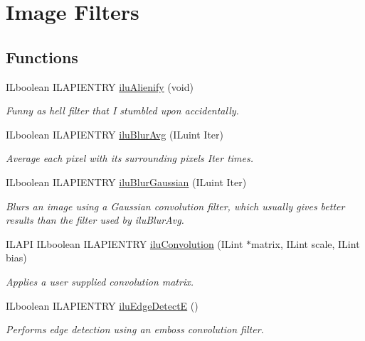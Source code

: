 \hypertarget{group__filter}{\section{Image Filters}
\label{group__filter}
}
\subsection*{Functions}
\begin{DoxyCompactItemize}
\item 
I\-Lboolean I\-L\-A\-P\-I\-E\-N\-T\-R\-Y \hyperlink{group__filter_gacb6e1a0e8dc10748f1cfbf60b1f8c350}{ilu\-Alienify} (void)
\begin{DoxyCompactList}\small\item\em Funny as hell filter that I stumbled upon accidentally. \end{DoxyCompactList}\item 
I\-Lboolean I\-L\-A\-P\-I\-E\-N\-T\-R\-Y \hyperlink{group__filter_ga017478330f243e5bb6e6edc29cdf1f37}{ilu\-Blur\-Avg} (I\-Luint Iter)
\begin{DoxyCompactList}\small\item\em Average each pixel with its surrounding pixels {\itshape Iter} times. \end{DoxyCompactList}\item 
I\-Lboolean I\-L\-A\-P\-I\-E\-N\-T\-R\-Y \hyperlink{group__filter_ga4163c484488b3afc352e3ed6c768babf}{ilu\-Blur\-Gaussian} (I\-Luint Iter)
\begin{DoxyCompactList}\small\item\em Blurs an image using a Gaussian convolution filter, which usually gives better results than the filter used by ilu\-Blur\-Avg. \end{DoxyCompactList}\item 
I\-L\-A\-P\-I I\-Lboolean I\-L\-A\-P\-I\-E\-N\-T\-R\-Y \hyperlink{group__filter_gaeb5bb85ceb172bd9742f7f0730a1d440}{ilu\-Convolution} (I\-Lint $\ast$matrix, I\-Lint scale, I\-Lint bias)
\begin{DoxyCompactList}\small\item\em Applies a user supplied convolution matrix. \end{DoxyCompactList}\item 
I\-Lboolean I\-L\-A\-P\-I\-E\-N\-T\-R\-Y \hyperlink{group__filter_gafbd320c463d5e8a45e68d0edb3973597}{ilu\-Edge\-Detect\-E} ()
\begin{DoxyCompactList}\small\item\em Performs edge detection using an emboss convolution filter. \end{DoxyCompactList}\item 

\end{DoxyCompactItemize}
